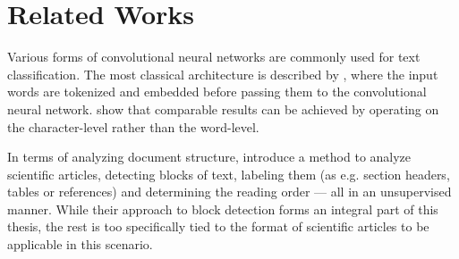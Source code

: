 \chapter{Related Works}
 Various forms of convolutional
neural networks are commonly used for text classification. The most classical
architecture is described by \textcite{kim2014conv}, where the input words are
tokenized and embedded before passing them to the convolutional neural network.
\textcite{zhang2015character} show that comparable results can be achieved by
operating on the character-level rather than the word-level.

In terms of analyzing document structure, \textcite{klampfl2014unsupervised}
introduce a method to analyze scientific articles, detecting blocks of text,
labeling them (as e.g. section headers, tables or references) and determining
the reading order --- all in an unsupervised manner. While their approach to
block detection forms an integral part of this thesis, the rest is too
specifically tied to the format of scientific articles to be applicable in this
scenario.

